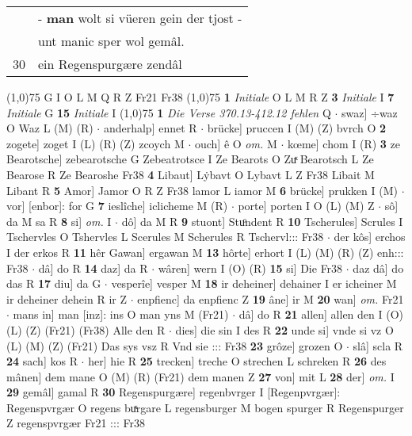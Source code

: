 \documentclass[8pt,a4paper,notitlepage]{article}
\begin{document}
\begin{table}[ht]
\begin{minipage}[t]{0.5\linewidth}
\begin{tabular}{rl}
 & - \textbf{man} wolt si vüeren gein der tjost -\\ 
 & unt manic sper wol gemâl.\\ 
30 & ein Regenspurgære zendâl\\ 
\end{tabular}
\scriptsize
\line(1,0){75} \newline
G I O L M Q R Z Fr21 Fr38 \newline
\line(1,0){75} \newline
\textbf{1} \textit{Initiale} O L M R Z  \textbf{3} \textit{Initiale} I  \textbf{7} \textit{Initiale} G  \textbf{15} \textit{Initiale} I  \newline
\line(1,0){75} \newline
\textbf{1} \textit{Die Verse 370.13-412.12 fehlen} Q   $\cdot$ swaz] ÷waz O Waz L (M) (R)  $\cdot$ anderhalp] ennet R  $\cdot$ brücke] pruccen I (M) (Z) bvrch O \textbf{2} zogete] zoget I (L) (R) (Z) zcoych M  $\cdot$ ouch] ê O \textit{om.} M  $\cdot$ kœme] chom I (R) \textbf{3} ze Bearotsche] zebearotsche G Zebeatrotsce I Ze Bearots O Zuͯ Bearotsch L Ze Bearose R Ze Bearoshe Fr38 \textbf{4} Libaut] Lẏbavt O Lybavt L Z Fr38 Libait M Libant R \textbf{5} Amor] Jamor O R Z Fr38 lamor L iamor M \textbf{6} brücke] prukken I (M)  $\cdot$ vor] [enbor]: for G \textbf{7} ieslîche] iclicheme M (R)  $\cdot$ porte] porten I O (L) (M) Z  $\cdot$ sô] da M sa R \textbf{8} si] \textit{om.} I  $\cdot$ dô] da M R \textbf{9} stuont] Stuͦndent R \textbf{10} Tscherules] Scrules I Tschervles O Tshervles L Scerules M Scherules R Tschervl::: Fr38  $\cdot$ der kôs] erchos I der erkos R \textbf{11} hêr Gawan] ergawan M \textbf{13} hôrte] erhort I (L) (M) (R) (Z) enh::: Fr38  $\cdot$ dâ] do R \textbf{14} daz] da R  $\cdot$ wâren] wern I (O) (R) \textbf{15} si] Die Fr38  $\cdot$ daz dâ] do das R \textbf{17} diu] da G  $\cdot$ vesperîe] vesper M \textbf{18} ir deheiner] dehainer I er icheiner M ir deheiner dehein R ir Z  $\cdot$ enpfienc] da enpfienc Z \textbf{19} âne] ir M \textbf{20} wan] \textit{om.} Fr21  $\cdot$ mans in] man [inz]: ins O man yns M (Fr21)  $\cdot$ dâ] do R \textbf{21} allen] allen den I (O) (L) (Z) (Fr21) (Fr38) Alle den R  $\cdot$ dies] die sin I des R \textbf{22} unde si] vnde si vz O (L) (M) (Z) (Fr21) Das sys vsz R Vnd sie ::: Fr38 \textbf{23} grôze] grozen O  $\cdot$ slâ] scla R \textbf{24} sach] kos R  $\cdot$ her] hie R \textbf{25} trecken] treche O strechen L schreken R \textbf{26} des mânen] dem mane O (M) (R) (Fr21) dem manen Z \textbf{27} von] mit L \textbf{28} der] \textit{om.} I \textbf{29} gemâl] gamal R \textbf{30} Regenspurgære] regenbvrger I [Regenpvrgær]: Regenspvrgær O regens buͯrgare L regensburger M bogen spurger R Regenspurger Z regenspvrgær Fr21 ::: Fr38 \newline

\end{minipage}
\end{table}
\end{document}
